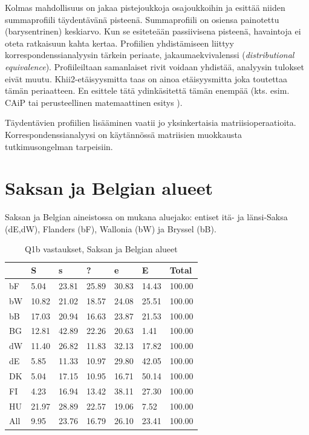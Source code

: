 \documentclass[
  finnish,
]{book}
\begin{document}
Kolmas mahdollisuus on jakaa pistejoukkoja osajoukkoihin ja esittää niiden
summaprofiili täydentävänä pisteenä. Summaprofiili on osiensa painotettu
(barysentrinen) keskiarvo. Kun se esiteteään passiivisena pisteenä, havaintoja ei
oteta ratkaisuun kahta kertaa. Profiilien yhdistämiseen liittyy
korrespondenssianalyysin tärkein periaate, jakaumaekvivalenssi (\emph{distributional
equivalence}). Profiileiltaan samanlaiset rivit voidaan yhdistää, analyysin tulokset
eivät muutu. Khii2-etäisyysmitta taas on ainoa etäisyysmitta joka toutettaa tämän
periaatteen. En esittele tätä ydinkäsitettä tämän enempää (kts. esim. CAiP tai
perusteellinen matemaattinen esitys \citep{RefWorks:doc:5a857a43e4b0ed2d44664d75}).

Täydentävien profiilien lisääminen vaatii jo yksinkertaisia matriisioperaatioita.
Korrespondenssianalyysi on käytännössä matriisien muokkausta tutkimusongelman
tarpeisiin.

\hypertarget{saksan-ja-belgian-alueet}{%
\section{Saksan ja Belgian alueet}\label{saksan-ja-belgian-alueet}}

Saksan ja Belgian aineistossa on mukana aluejako: entiset itä- ja länsi-Saksa
(dE,dW), Flanders (bF), Wallonia (bW) ja Bryssel (bB).

\begin{table}

\caption{\label{tab:BeDealueTable1}Q1b vastaukset, Saksan ja Belgian alueet}
\centering
\begin{tabular}[t]{lllllll}
\toprule
  & S & s & ? & e & E & Total\\
\midrule
bF & 5.04 & 23.81 & 25.89 & 30.83 & 14.43 & 100.00\\
bW & 10.82 & 21.02 & 18.57 & 24.08 & 25.51 & 100.00\\
bB & 17.03 & 20.94 & 16.63 & 23.87 & 21.53 & 100.00\\
BG & 12.81 & 42.89 & 22.26 & 20.63 & 1.41 & 100.00\\
dW & 11.40 & 26.82 & 11.83 & 32.13 & 17.82 & 100.00\\
\addlinespace
dE & 5.85 & 11.33 & 10.97 & 29.80 & 42.05 & 100.00\\
DK & 5.04 & 17.15 & 10.95 & 16.71 & 50.14 & 100.00\\
FI & 4.23 & 16.94 & 13.42 & 38.11 & 27.30 & 100.00\\
HU & 21.97 & 28.89 & 22.57 & 19.06 & 7.52 & 100.00\\
All & 9.95 & 23.76 & 16.79 & 26.10 & 23.41 & 100.00\\
\bottomrule
\end{tabular}
\end{table}
\end{document}
